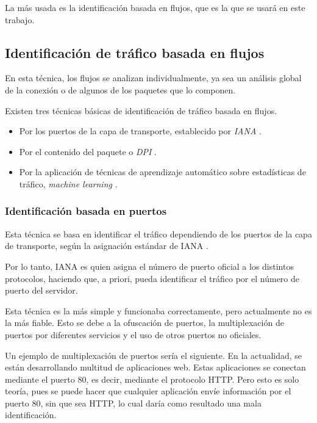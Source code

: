 \intro La más usada es la identificación basada en flujos, que es la que se usará en este trabajo.

\subsection{Identificación de tráfico basada en flujos}

En esta técnica, los flujos se analizan individualmente, ya sea un análisis global de la conexión o de algunos de los paquetes que lo 
componen.

\intro Existen tres técnicas básicas de identificación de tráfico basada en flujos.

\begin{itemize}
\item Por los puertos de la capa de transporte, establecido por \textit{IANA} \cite{iana}.
\item Por el contenido del paquete o \textit{DPI} \cite{payload}.
\item Por la aplicación de técnicas de aprendizaje automático sobre estadísticas de tráfico, \textit{machine learning} \cite{learning}.
\end{itemize}

\subsubsection{Identificación basada en puertos}

Esta técnica se basa en identificar el tráfico dependiendo de los puertos de la capa de transporte, según la asignación estándar 
de IANA \cite{ianaexplicacion}. 

\intro Por lo tanto, IANA es quien asigna el número de puerto oficial a los distintos protocolos, haciendo que, a priori, pueda 
identificar el tráfico por el número de puerto del servidor. 

\intro Esta técnica es la más simple y funcionaba correctamente, pero actualmente no es la más fiable. Esto se debe a la ofuscación de 
puertos, la multiplexación de puertos por diferentes servicios y el uso de otros puertos no oficiales.

\intro Un ejemplo de multiplexación de puertos sería el siguiente. En la actualidad, se están desarrollando multitud de aplicaciones 
web. Estas aplicaciones se conectan mediante el puerto 80, es decir, mediante el protocolo HTTP. Pero esto es solo teoría, pues se 
puede hacer que cualquier aplicación envíe información por el puerto 80, sin que sea HTTP, lo cual daría como resultado una mala 
identificación.

